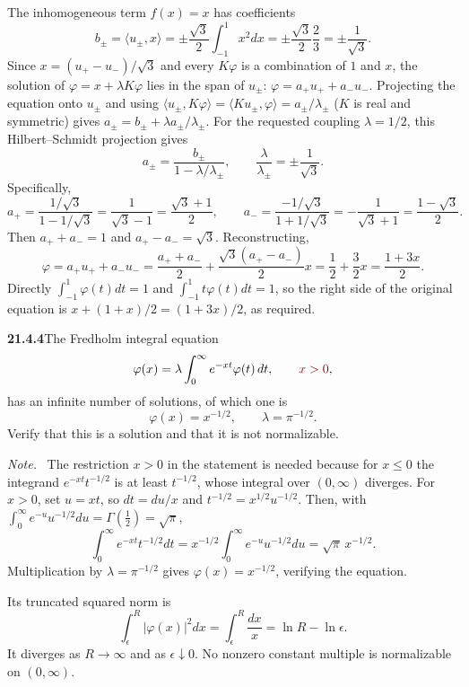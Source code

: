 The inhomogeneous term $f(x)=x$ has coefficients
\[
b_\pm=\langle u_\pm,x\rangle
=\pm\frac{\sqrt3}{2}\int_{-1}^1x^2dx
=\pm\frac{\sqrt3}{2}\frac23
=\pm\frac1{\sqrt3}.
\]
Since $x=(u_+-u_-)/\sqrt3$ and every $K\varphi$ is a combination of
$1$ and $x$, the solution of $\varphi=x+\lambda K\varphi$ lies in the
span of $u_\pm$: $\varphi=a_+u_++a_-u_-$. Projecting the equation onto
$u_\pm$ and using $\langle u_\pm,K\varphi\rangle
=\langle Ku_\pm,\varphi\rangle=a_\pm/\lambda_\pm$ ($K$ is real and
symmetric) gives $a_\pm=b_\pm+\lambda a_\pm/\lambda_\pm$. For the
requested coupling $\lambda=1/2$, this Hilbert--Schmidt
projection gives
\[
a_\pm=\frac{b_\pm}{1-\lambda/\lambda_\pm},\qquad
\frac{\lambda}{\lambda_\pm}=\pm\frac1{\sqrt3}.
\]
Specifically,
\[
a_+=\frac{1/\sqrt3}{1-1/\sqrt3}=\frac1{\sqrt3-1}=\frac{\sqrt3+1}{2},\qquad
a_-=\frac{-1/\sqrt3}{1+1/\sqrt3}=-\frac1{\sqrt3+1}=\frac{1-\sqrt3}{2}.
\]
Then $a_++a_-=1$ and $a_+-a_-=\sqrt3$. Reconstructing,
\[
\varphi=a_+u_++a_-u_-
=\frac{a_++a_-}{2}
+\frac{\sqrt3(a_+-a_-)}2x
=\frac12+\frac32x
=\boxed{\frac{1+3x}{2}}.
\]
Directly $\int_{-1}^1\varphi(t)dt=1$ and
$\int_{-1}^1t\varphi(t)dt=1$, so the right side of the
original equation is $x+(1+x)/2=(1+3x)/2$, as required.


\par\bigskip
\noindent\textbf{21.4.4}\quad The Fredholm integral equation
\[
\varphi(x)=\lambda\int_{0}^{\infty}e^{-xt}\varphi(t)\,dt,
\qquad\erratum{x>0},
\]
has an infinite number of solutions, of which one is
\[
\varphi(x)=x^{-1/2},\qquad\lambda=\pi^{-1/2}.
\]
Verify that this is a solution and that it is not normalizable.
\par\emph{Note.}~
\solution
The restriction $x>0$ in the statement is needed because for $x\le0$
the integrand $e^{-xt}t^{-1/2}$ is at least $t^{-1/2}$, whose integral
over $(0,\infty)$ diverges.
For $x>0$, set $u=xt$, so $dt=du/x$ and
$t^{-1/2}=x^{1/2}u^{-1/2}$. Then, with
$\int_0^\infty e^{-u}u^{-1/2}du=\Gamma(\frac12)=\sqrt\pi$,
\[
\int_0^\infty e^{-xt}t^{-1/2}dt
=x^{-1/2}\int_0^\infty e^{-u}u^{-1/2}du
=\sqrt\pi\,x^{-1/2}.
\]
Multiplication by $\lambda=\pi^{-1/2}$ gives
$\boxed{\varphi(x)=x^{-1/2}}$, verifying the equation.

Its truncated squared norm is
\[
\int_\epsilon^R|\varphi(x)|^2dx
=\int_\epsilon^R\frac{dx}{x}
=\ln R-\ln\epsilon.
\]
It diverges as $R\to\infty$ and as $\epsilon\downarrow0$.
No nonzero constant multiple is normalizable on $(0,\infty)$.

